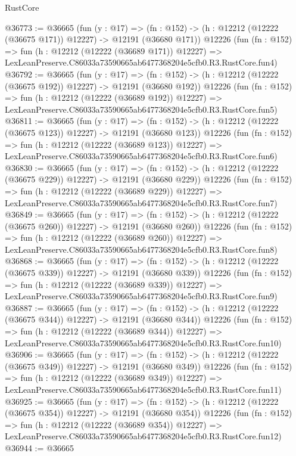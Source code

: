 \begin{lexlean}{RustCore}
\begin{coremodule}
@36773 := @36665
    (fun (y : @17) =>
    (fn : @152) -> (h : @12212 (@12222 (@36675 @171)) @12227) -> @12191 (@36680 @171))
    @12226
    (fun (fn : @152) =>
    fun (h : @12212 (@12222 (@36689 @171)) @12227) =>
    LexLeanPreserve.C86033a73590665ab6477368204e5cfb0.R3.RustCore.fun4)
@36792 := @36665
    (fun (y : @17) =>
    (fn : @152) -> (h : @12212 (@12222 (@36675 @192)) @12227) -> @12191 (@36680 @192))
    @12226
    (fun (fn : @152) =>
    fun (h : @12212 (@12222 (@36689 @192)) @12227) =>
    LexLeanPreserve.C86033a73590665ab6477368204e5cfb0.R3.RustCore.fun5)
@36811 := @36665
    (fun (y : @17) =>
    (fn : @152) -> (h : @12212 (@12222 (@36675 @123)) @12227) -> @12191 (@36680 @123))
    @12226
    (fun (fn : @152) =>
    fun (h : @12212 (@12222 (@36689 @123)) @12227) =>
    LexLeanPreserve.C86033a73590665ab6477368204e5cfb0.R3.RustCore.fun6)
@36830 := @36665
    (fun (y : @17) =>
    (fn : @152) -> (h : @12212 (@12222 (@36675 @229)) @12227) -> @12191 (@36680 @229))
    @12226
    (fun (fn : @152) =>
    fun (h : @12212 (@12222 (@36689 @229)) @12227) =>
    LexLeanPreserve.C86033a73590665ab6477368204e5cfb0.R3.RustCore.fun7)
@36849 := @36665
    (fun (y : @17) =>
    (fn : @152) -> (h : @12212 (@12222 (@36675 @260)) @12227) -> @12191 (@36680 @260))
    @12226
    (fun (fn : @152) =>
    fun (h : @12212 (@12222 (@36689 @260)) @12227) =>
    LexLeanPreserve.C86033a73590665ab6477368204e5cfb0.R3.RustCore.fun8)
@36868 := @36665
    (fun (y : @17) =>
    (fn : @152) -> (h : @12212 (@12222 (@36675 @339)) @12227) -> @12191 (@36680 @339))
    @12226
    (fun (fn : @152) =>
    fun (h : @12212 (@12222 (@36689 @339)) @12227) =>
    LexLeanPreserve.C86033a73590665ab6477368204e5cfb0.R3.RustCore.fun9)
@36887 := @36665
    (fun (y : @17) =>
    (fn : @152) -> (h : @12212 (@12222 (@36675 @344)) @12227) -> @12191 (@36680 @344))
    @12226
    (fun (fn : @152) =>
    fun (h : @12212 (@12222 (@36689 @344)) @12227) =>
    LexLeanPreserve.C86033a73590665ab6477368204e5cfb0.R3.RustCore.fun10)
@36906 := @36665
    (fun (y : @17) =>
    (fn : @152) -> (h : @12212 (@12222 (@36675 @349)) @12227) -> @12191 (@36680 @349))
    @12226
    (fun (fn : @152) =>
    fun (h : @12212 (@12222 (@36689 @349)) @12227) =>
    LexLeanPreserve.C86033a73590665ab6477368204e5cfb0.R3.RustCore.fun11)
@36925 := @36665
    (fun (y : @17) =>
    (fn : @152) -> (h : @12212 (@12222 (@36675 @354)) @12227) -> @12191 (@36680 @354))
    @12226
    (fun (fn : @152) =>
    fun (h : @12212 (@12222 (@36689 @354)) @12227) =>
    LexLeanPreserve.C86033a73590665ab6477368204e5cfb0.R3.RustCore.fun12)
@36944 := @36665

\end{coremodule}
\end{lexlean}
